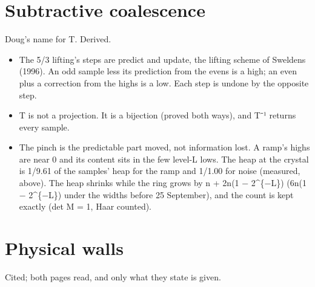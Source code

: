 \section{\texorpdfstring{Subtractive coalescence}{Subtractive coalescence}}

Doug's name for T. Derived.

\begin{itemize}
\item The 5/3 lifting's steps are predict and update, the lifting scheme of Sweldens (1996). An odd sample less its prediction from the evens is a high; an even plus a correction from the highs is a low. Each step is undone by the opposite step.
\item T is not a projection. It is a bijection (proved both ways), and T⁻¹ returns every sample.
\item The pinch is the predictable part moved, not information lost. A ramp's highs are near 0 and its content sits in the few level-L lows. The heap at the crystal is 1/9.61 of the samples' heap for the ramp and 1/1.00 for noise (measured, above). The heap shrinks while the ring grows by n + 2n(1 − 2\textasciicircum{}\{−L\}) (6n(1 − 2\textasciicircum{}\{−L\}) under the widths before 25 September), and the count is kept exactly (det M = 1, Haar counted).
\end{itemize}

\section{\texorpdfstring{Physical walls}{Physical walls}}

Cited; both pages read, and only what they state is given.

